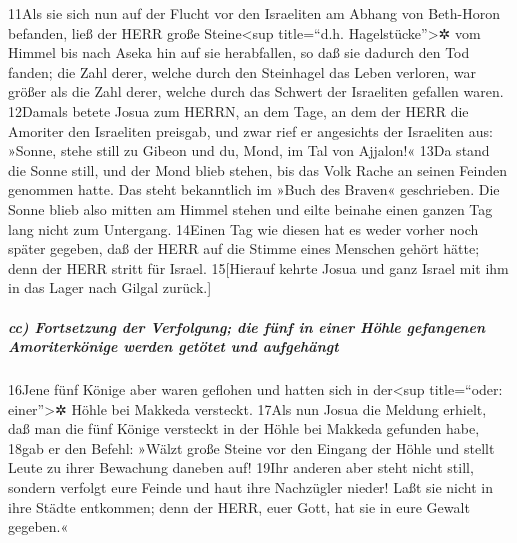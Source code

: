 11Als sie sich nun auf der Flucht vor den Israeliten am Abhang von
Beth-Horon befanden, ließ der HERR große Steine\textless sup
title=``d.h. Hagelstücke''\textgreater✲ vom Himmel bis nach Aseka hin
auf sie herabfallen, so daß sie dadurch den Tod fanden; die Zahl derer,
welche durch den Steinhagel das Leben verloren, war größer als die Zahl
derer, welche durch das Schwert der Israeliten gefallen waren. 12Damals
betete Josua zum HERRN, an dem Tage, an dem der HERR die Amoriter den
Israeliten preisgab, und zwar rief er angesichts der Israeliten aus:
»Sonne, stehe still zu Gibeon und du, Mond, im Tal von Ajjalon!« 13Da
stand die Sonne still, und der Mond blieb stehen, bis das Volk Rache an
seinen Feinden genommen hatte. Das steht bekanntlich im »Buch des
Braven« geschrieben. Die Sonne blieb also mitten am Himmel stehen und
eilte beinahe einen ganzen Tag lang nicht zum Untergang. 14Einen Tag wie
diesen hat es weder vorher noch später gegeben, daß der HERR auf die
Stimme eines Menschen gehört hätte; denn der HERR stritt für Israel.
15{[}Hierauf kehrte Josua und ganz Israel mit ihm in das Lager nach
Gilgal zurück.{]}

\hypertarget{cc-fortsetzung-der-verfolgung-die-fuxfcnf-in-einer-huxf6hle-gefangenen-amoriterkuxf6nige-werden-getuxf6tet-und-aufgehuxe4ngt}{%
\subparagraph{cc) Fortsetzung der Verfolgung; die fünf in einer Höhle
gefangenen Amoriterkönige werden getötet und
aufgehängt}\label{cc-fortsetzung-der-verfolgung-die-fuxfcnf-in-einer-huxf6hle-gefangenen-amoriterkuxf6nige-werden-getuxf6tet-und-aufgehuxe4ngt}}

16Jene fünf Könige aber waren geflohen und hatten sich in
der\textless sup title=``oder: einer''\textgreater✲ Höhle bei Makkeda
versteckt. 17Als nun Josua die Meldung erhielt, daß man die fünf Könige
versteckt in der Höhle bei Makkeda gefunden habe, 18gab er den Befehl:
»Wälzt große Steine vor den Eingang der Höhle und stellt Leute zu ihrer
Bewachung daneben auf! 19Ihr anderen aber steht nicht still, sondern
verfolgt eure Feinde und haut ihre Nachzügler nieder! Laßt sie nicht in
ihre Städte entkommen; denn der HERR, euer Gott, hat sie in eure Gewalt
gegeben.«


